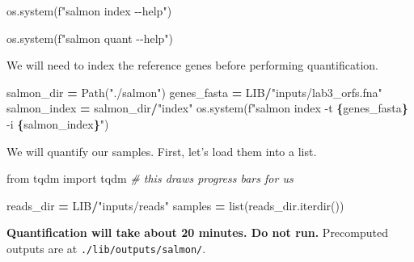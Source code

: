 \documentclass[
]{book}
\newenvironment{Shaded}{\begin{snugshade}}{\end{snugshade}}
\newcommand{\BuiltInTok}[1]{#1}
\newcommand{\CommentTok}[1]{\textcolor[rgb]{0.56,0.35,0.01}{\textit{#1}}}
\newcommand{\ImportTok}[1]{#1}
\newcommand{\NormalTok}[1]{#1}
\newcommand{\OperatorTok}[1]{\textcolor[rgb]{0.81,0.36,0.00}{\textbf{#1}}}
\newcommand{\SpecialCharTok}[1]{\textcolor[rgb]{0.81,0.36,0.00}{\textbf{#1}}}
\newcommand{\SpecialStringTok}[1]{\textcolor[rgb]{0.31,0.60,0.02}{#1}}
\newcommand{\StringTok}[1]{\textcolor[rgb]{0.31,0.60,0.02}{#1}}
\begin{document}
\begin{Shaded}
\begin{Highlighting}[numbers=left,,]
\NormalTok{os.system(}\SpecialStringTok{f"salmon index {-}{-}help"}\NormalTok{)}
\end{Highlighting}
\end{Shaded}

\begin{Shaded}
\begin{Highlighting}[numbers=left,,]
\NormalTok{os.system(}\SpecialStringTok{f"salmon quant {-}{-}help"}\NormalTok{)}
\end{Highlighting}
\end{Shaded}

We will need to index the reference genes before performing quantification.

\begin{Shaded}
\begin{Highlighting}[numbers=left,,]
\NormalTok{salmon\_dir }\OperatorTok{=}\NormalTok{ Path(}\StringTok{"./salmon"}\NormalTok{)}
\NormalTok{genes\_fasta }\OperatorTok{=}\NormalTok{ LIB}\OperatorTok{/}\StringTok{"inputs/lab3\_orfs.fna"}
\NormalTok{salmon\_index }\OperatorTok{=}\NormalTok{ salmon\_dir}\OperatorTok{/}\StringTok{"index"}
\NormalTok{os.system(}\SpecialStringTok{f"salmon index {-}t }\SpecialCharTok{\{}\NormalTok{genes\_fasta}\SpecialCharTok{\}}\SpecialStringTok{ {-}i }\SpecialCharTok{\{}\NormalTok{salmon\_index}\SpecialCharTok{\}}\SpecialStringTok{"}\NormalTok{)}
\end{Highlighting}
\end{Shaded}

We will quantify our samples. First, let's load them into a list.

\begin{Shaded}
\begin{Highlighting}[numbers=left,,]
\ImportTok{from}\NormalTok{ tqdm }\ImportTok{import}\NormalTok{ tqdm }\CommentTok{\# this draws progress bars for us}

\NormalTok{reads\_dir }\OperatorTok{=}\NormalTok{ LIB}\OperatorTok{/}\StringTok{"inputs/reads"}
\NormalTok{samples }\OperatorTok{=} \BuiltInTok{list}\NormalTok{(reads\_dir.iterdir())}
\end{Highlighting}
\end{Shaded}

\textbf{Quantification will take about 20 minutes. Do not run.}
Precomputed outputs are at \texttt{./lib/outputs/salmon/}.
\end{document}
